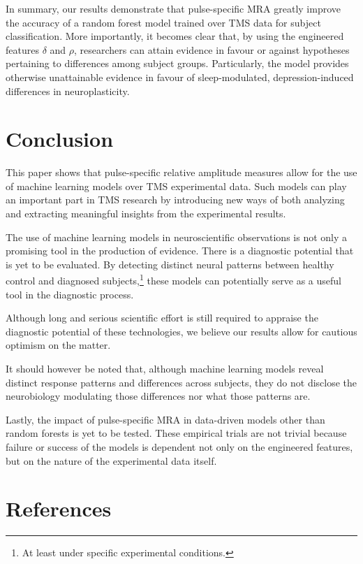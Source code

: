 \documentclass{article}
\begin{document}
\begin{multicols}{2}
In summary, our results demonstrate that pulse-specific MRA greatly improve the
accuracy of a random forest model trained over TMS data for subject
classification. More importantly, it becomes clear that, by using the engineered
features $\delta$ and $\rho$, researchers can attain evidence in favour or
against hypotheses pertaining to differences among subject groups. Particularly,
the model provides otherwise unattainable evidence in favour of sleep-modulated,
depression-induced differences in neuroplasticity.

\section{Conclusion}

This paper shows that pulse-specific relative amplitude measures allow for the
use of machine learning models over TMS experimental data. Such models
can play an important part in TMS research by introducing new ways of
both analyzing and extracting meaningful insights from the experimental results.

The use of machine learning models in neuroscientific observations is not only a
promising tool in the production of evidence. There is a diagnostic potential
that is yet to be evaluated. By detecting distinct neural patterns between
healthy control and diagnosed subjects,\footnote{At least under specific
experimental conditions.} these models can potentially serve as a useful tool in
the diagnostic process.

Although long and serious scientific effort is still required to appraise the
diagnostic potential of these technologies, we believe our results allow
for cautious optimism on the matter.

It should however be noted that, although machine learning models reveal
distinct response patterns and differences across subjects, they do not disclose
the neurobiology modulating those differences nor what those patterns are. 

Lastly, the impact of pulse-specific MRA in data-driven models other than random forests
is yet to be tested. These empirical trials are not trivial because failure or
success of the models is dependent not only on the engineered features, but on
the nature of the experimental data itself. 

\end{multicols}

\section{References}
\end{document}
